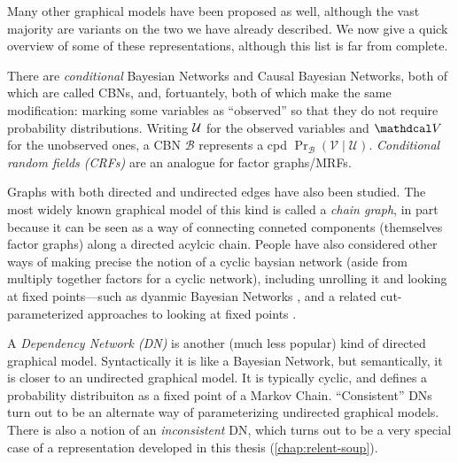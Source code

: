 Many other graphical models have been proposed as well, although
the vast majority are variants on the two we have already described. 
We now give a quick overview of some of these representations, although this list is far from complete. 

There are \emph{conditional} Bayesian Networks and Causal Bayesian Networks, both of which are called CBNs, and, fortuantely, both of which make the same modification: marking some variables as ``observed'' so that they do not require probability distributions. 
Writing $\mathcal U$ for the observed variables and $\V$ for the unobserved ones, a CBN $\mathcal B$ represents a cpd $\Pr_{\mathcal B}(\mathcal V \mid \mathcal U)$. 
%
\emph{Conditional random fields (CRFs)} are an analogue for factor graphs/MRFs.

Graphs with both directed and undirected edges have also been studied. The most widely known graphical model of this kind is called a \emph{chain graph}, in part because it can be seen as a way of connecting conneted components (themselves factor graphs) along a directed acylcic chain.
People have also considered other ways of making precise the notion of a cyclic baysian network (aside from multiply together factors for a cyclic network), including unrolling it and looking at fixed points---such as dyanmic Bayesian Networks \citep{dean1989model}\citep[\S6.2]{KF09}, and a related cut-parameterized approaches to looking at fixed points \citep{Baier_2022}.

A \emph{Dependency Network (DN)} is another
    (much less popular) kind of directed graphical model.
Syntactically it is like a Bayesian Network, but semantically, it is closer to an undirected graphical model. 
It is typically cyclic, and defines a probability distribuiton as a fixed point of a Markov Chain. 
``Consistent'' DNs turn out to be an alternate way of parameterizing undirected graphical models.
There is also a notion of an \emph{inconsistent} DN, which turns out to be a very special case of a representation developed in this thesis (\cref{chap:relent-soup}).


